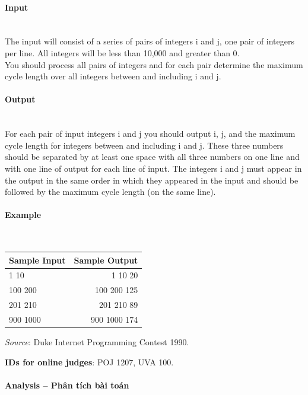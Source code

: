\documentclass{article}
\begin{document}
\paragraph{Input} \mbox{} \\
The input will consist of a series of pairs of integers i and j, one pair of integers per line. All integers
will be less than 10,000 and greater than 0.\\
You should process all pairs of integers and for each pair determine the maximum cycle length
over all integers between and including i and j.

\paragraph{Output}\mbox{} \\
For each pair of input integers i and j you should output i, j, and the maximum cycle length for
integers between and including i and j. These three numbers should be separated by at least one
space with all three numbers on one line and with one line of output for each line of input. The
integers i and j must appear in the output in the same order in which they appeared in the input
and should be followed by the maximum cycle length (on the same line).

\paragraph{Example}\mbox{} \\

\begin{table}[h]
    \centering
    \begin{tabular}{|l|r|}
        \hline
        \textbf{Sample Input} & \textbf{Sample Output} \\
        \hline
        1 10    & 1 10 20   \\ 
        100 200  & 100 200 125  \\ 
        201 210  & 201 210 89  \\ 
        900 1000  & 900 1000 174  \\
        \hline
    \end{tabular}
\end{table}

\textit{Source}: Duke Internet Programming Contest 1990.

\textbf{IDs for online judges}: POJ 1207, UVA 100.


\paragraph{Analysis -- Phân tích bài toán} \mbox{} \\
\end{document}
